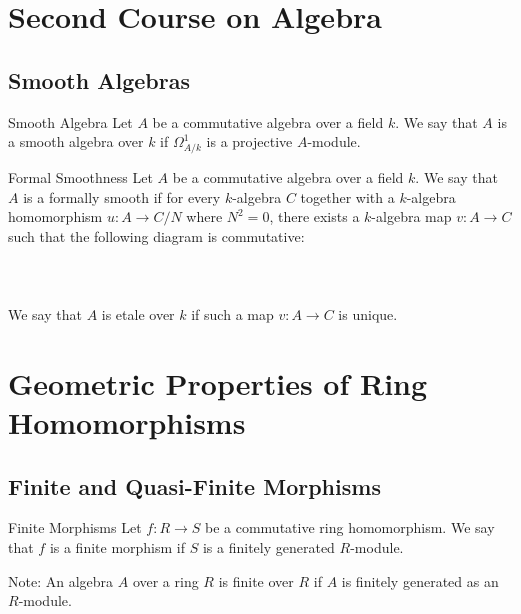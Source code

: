 \documentclass[a4paper]{article}
\begin{document}
\pagebreak
\section{Second Course on Algebra}
\subsection{Smooth Algebras}
\begin{defn}{Smooth Algebra}{} Let $A$ be a commutative algebra over a field $k$. We say that $A$ is a smooth algebra over $k$ if $\Omega_{A/k}^1$ is a projective $A$-module. 
\end{defn}

\begin{defn}{Formal Smoothness}{} Let $A$ be a commutative algebra over a field $k$. We say that $A$ is a formally smooth if for every $k$-algebra $C$ together with a $k$-algebra homomorphism $u:A\to C/N$ where $N^2=0$, there exists a $k$-algebra map $v:A\to C$ such that the following diagram is commutative:  \\~\\
\\~\\
We say that $A$ is etale over $k$ if such a map $v:A\to C$ is unique. 
\end{defn}

\section{Geometric Properties of Ring Homomorphisms}
\subsection{Finite and Quasi-Finite Morphisms}
\begin{defn}{Finite Morphisms}{} Let $f:R\to S$ be a commutative ring homomorphism. We say that $f$ is a finite morphism if $S$ is a finitely generated $R$-module. 
\end{defn}

Note: An algebra $A$ over a ring $R$ is finite over $R$ if $A$ is finitely generated as an $R$-module. \\~\\
\end{document}
